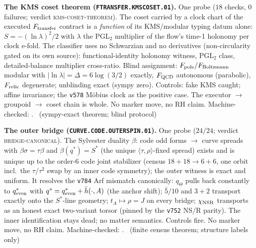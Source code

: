 \documentclass[11pt,a4paper]{article}
\theoremstyle{definition}
\begin{document}
\par\smallskip\noindent\textbf{The KMS coset theorem
(\texttt{FTRANSFER.KMSCOSET.01}).}
One probe ($18$ checks, $0$ failures; verdict
\textsc{kms-coset-theorem}).  The coset carried by a clock chart of
the executed $F_{\rm transfer}$ contract is a \emph{function} of its
KMS/modular typing datum alone: $S=-(\ln\lambda)^2/2$ with $\lambda$
the PGL$_2$ multiplier of the flow's time-1 holonomy per clock
e-fold.  The classifier uses no Schwarzian and no derivatives
(non-circularity gated on its own source): functional-identity
holonomy witness, PGL$_2$ class, detailed-balance multiplier
cross-ratio.  Blind assignment: $F_{\rm pole}/F_{\rm Boltzmann}$
modular with $|\ln\lambda|=\Delta=6\log(3/2)$ exactly, $F_{\rm QCD}$
autonomous (parabolic), $F_{\rm relic}$ degenerate; unblinding exact
(sympy zero).  Controls: fake KMS caught; affine invariance; the
\texttt{v578} M\"obius clock as the positive case.  The
executor $\to$ groupoid $\to$ coset chain is whole.  No marker move,
no RH claim.
Machine-checked: .
\mE\ (sympy-exact theorem; blind protocol)
\par\smallskip

\par\smallskip\noindent\textbf{The outer bridge
(\texttt{CURVE.CODE.OUTERSPIN.01}).}
One probe ($24/24$; verdict \textsc{bridge-canonical}).  The
Sylvester duality $\beta$: code odd forms $\to$ curve spreads with
$\beta\sigma=\tau\beta$ and $\beta(q^{*})=S^{*}$ (the unique
$\langle\tau,\rho\rangle$-fixed spread) exists and is unique up to
the order-6 code joint stabilizer (census $18+18\to6+6$, one orbit
incl.\ the $\tau/\tau^2$ swap by an inner code symmetry); the outer
witness is exact and uniform.  It resolves the \texttt{v784} Arf
mismatch canonically: $q_{\Theta}$ pulls back constantly to
$q^{*}_{\rm even}$ with $q^{*}=q^{*}_{\rm even}+\bar h(\cdot,A)$
(the anchor shift); $\bar 5/10$ and $3{+}2$ transport exactly onto
the $S^{*}$-line geometry; $t_A\mapsto\rho=J$ on every bridge;
$\chi_{\rm NSR}$ transports as an honest exact two-variant torsor
(pinned by the \texttt{v752} NS/R parity).  The inner identification
stays dead; no matter semantics.  Controls fire.  No marker move,
no RH claim.
Machine-checked: .
\mE\ (finite census theorem; structure labels only)
\par\smallskip
\end{document}
